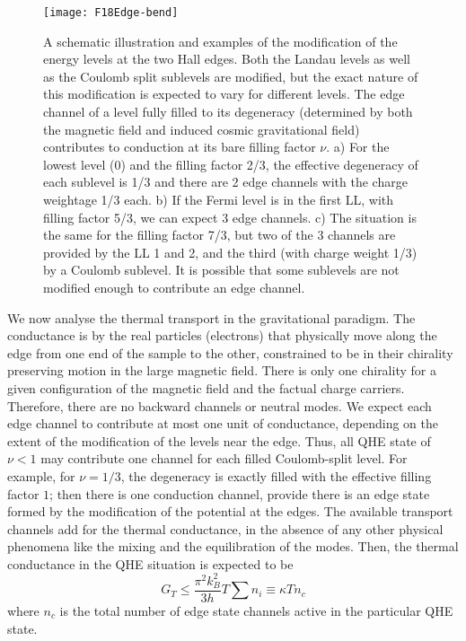 \documentclass[aps,preprint,12pt,tightenlines]{revtex4}%
\begin{document}
\begin{figure}
	\centering
	\texttt{[image: F18Edge-bend]}
	\caption{A schematic illustration and examples of the modification of the energy levels at the two Hall edges. Both the Landau levels as well as the Coulomb split sublevels are modified, but the exact nature of this modification is expected to vary for different levels. The edge channel of a level fully filled to its degeneracy (determined by both the magnetic field and induced cosmic gravitational field) contributes to conduction at its bare filling factor $\nu$. a) For the lowest level (0) and the filling factor 2/3, the effective degeneracy of each sublevel is 1/3 and there are 2 edge channels with the charge weightage 1/3 each. b) If the Fermi level is in the first LL, with filling factor 5/3, we can expect 3 edge channels. c) The situation is the same for the filling factor 7/3, but two of the 3 channels are provided by the LL 1 and 2, and the third (with charge weight 1/3) by a Coulomb sublevel. It is possible that some sublevels are not modified enough to contribute an edge channel.}
	\label{fig:edge-bend}
\end{figure}
We now analyse the thermal transport in the gravitational paradigm. The
conductance is by the real particles (electrons) that physically move along
the edge from one end of the sample to the other, constrained to be in their
chirality preserving motion in the large magnetic field. There is only one
chirality for a given configuration of the magnetic field and the factual
charge carriers. Therefore, there are no backward channels or neutral modes.
We expect each edge channel to contribute at most one unit of conductance,
depending on the extent of the modification of the levels near the edge. Thus,
all QHE state of $\nu<1$ may contribute one channel for each filled
Coulomb-split level. For example, for $\nu=1/3$, the degeneracy is exactly
filled with the effective filling factor $1$; then there is one conduction
channel, provide there is an edge state formed by the modification of the
potential at the edges. The available transport channels add for the thermal
conductance, in the absence of any other physical phenomena like the mixing
and the equilibration of the modes. Then, the thermal conductance in the QHE
situation is expected to be
\begin{equation}
G_{T}\leq\frac{\pi^{2}k_{B}^{2}}{3h}T\sum n_{i}\equiv\kappa Tn_{c}%
\end{equation}
where $n_{c}$ is the total number of edge state channels active in the
particular QHE state.
\end{document}
